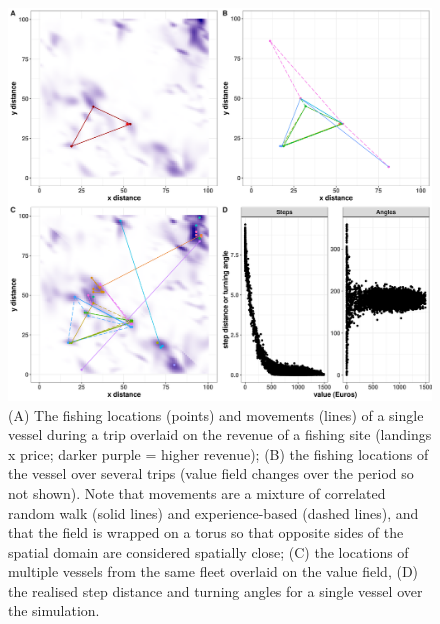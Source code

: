 \documentclass[preprint]{elsarticle}
\begin{document}
\begin{figure}[!ht]
	\includegraphics[width = \linewidth]{Plots/Combined_Movement}
	\caption{(A) The fishing locations (points) and movements (lines) of a
		single vessel during a trip overlaid on the revenue of a
		fishing site (landings x price; darker purple = higher
		revenue); (B) the fishing locations of the vessel over several
		trips (value field changes over the period so not shown). Note
		that movements are a mixture of correlated random walk (solid
		lines) and experience-based (dashed lines), and that the field
		is wrapped on a torus so that opposite sides of the spatial
		domain are considered spatially close; (C) the locations of
		multiple vessels from the same fleet overlaid on the value
		field, (D) the realised step distance and turning angles for a
		single vessel over the simulation.}
	\label{fig:mv}
\end{figure}	
\end{document}
